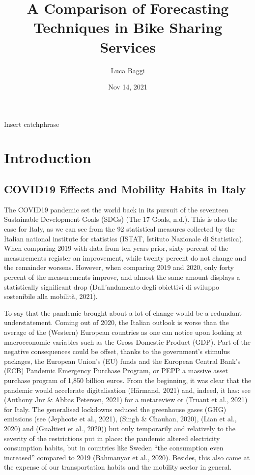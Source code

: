 \documentclass[letterpaper,10pt,english]{jupyterBook}
\title{A Comparison of Forecasting Techniques in Bike Sharing Services}
\date{Nov 14, 2021}
\author{Luca Baggi}
\begin{document}
\pagestyle{empty}
\sphinxmaketitle
\pagestyle{plain}
\sphinxtableofcontents
\pagestyle{normal}
\label{\detokenize{frontmatter::doc}}


\sphinxAtStartPar
Insert catchphrase


\chapter{Introduction}
\label{\detokenize{01-introduction:introduction}}\label{\detokenize{01-introduction::doc}}

\section{COVID\sphinxhyphen{}19 Effects and Mobility Habits in Italy}
\label{\detokenize{01-introduction:covid-19-effects-and-mobility-habits-in-italy}}
\sphinxAtStartPar
The COVID\sphinxhyphen{}19 pandemic set the world back in its pursuit of the seventeen Sustainable Development Goals (SDGs) (The 17 Goals, n.d.). This is also the case for Italy, as we can see from the 92 statistical measures collected by the Italian national institute for statistics (ISTAT, Istituto Nazionale di Statistica). When comparing 2019 with data from ten years prior, sixty percent of the measurements register an improvement, while twenty percent do not change and the remainder worsens. However, when comparing 2019 and 2020, only forty percent of the measurements improve, and almost the same amount displays a statistically significant drop (Dall’andamento degli obiettivi di sviluppo sostenibile alla mobilità, 2021).

\sphinxAtStartPar
To say that the pandemic brought about a lot of change would be a redundant understatement. Coming out of 2020, the Italian outlook is worse than the average of the (Western) European countries \sphinxhyphen{} as one can notice upon looking at macroeconomic variables such as the Gross Domestic Product (GDP). Part of the negative consequences could be offset, thanks to the government’s stimulus packages, the European Union’s (EU) funds and the European Central Bank’s (ECB) Pandemic Emergency Purchase Program, or PEPP \sphinxhyphen{} a massive asset purchase program of 1,850 billion euros. From the beginning, it was clear that the pandemic would accelerate digitalisation (Härmand, 2021) \sphinxhyphen{} and, indeed, it has: see (Anthony Jnr \& Abbas Petersen, 2021) for a meta\sphinxhyphen{}review or (Truant et al., 2021) for Italy. The generalised lockdowns reduced the greenhouse gases (GHG) emissions (see (Jephcote et al., 2021), (Singh \& Chauhan, 2020), (Lian et al., 2020) and (Gualtieri et al., 2020)) but only temporarily and relatively to the severity of the restrictions put in place: the pandemic altered electricity consumption habits, but in countries like Sweden “the consumption even increased” compared to 2019 (Bahmanyar et al., 2020). Besides, this also came at the expense of our transportation habits and the mobility sector in general.
\end{document}

